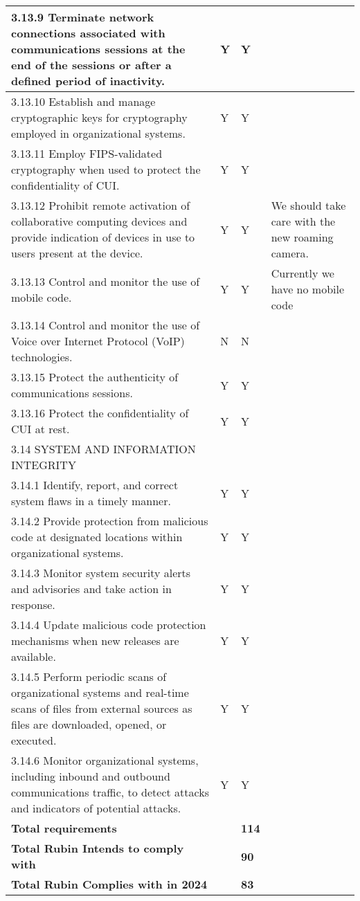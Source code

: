 \begin{longtable} {|p{}|p{}|p{}|p{} |}
{3.13.9 Terminate network connections associated with communications sessions at the end of the sessions or after a defined period of inactivity.}&{Y}&{Y}& \\ \hline
{3.13.10 Establish and manage cryptographic keys for cryptography employed in organizational systems.}&{Y}&{Y}& \\ \hline
{3.13.11 Employ FIPS-validated cryptography when used to protect the confidentiality of CUI.}&{Y}&{Y}& \\ \hline
{3.13.12 Prohibit remote activation of collaborative computing devices and provide indication of devices in use to users present at the device.}&{Y}&{Y}&{We should take care with the new roaming camera.} \\ \hline
{3.13.13 Control and monitor the use of mobile code.}&{Y}&{Y}&{Currently we have no mobile code} \\ \hline
{3.13.14 Control and monitor the use of Voice over Internet Protocol (VoIP) technologies.}&{N}&{N}& \\ \hline
{3.13.15 Protect the authenticity of communications sessions.}&{Y}&{Y}& \\ \hline
{3.13.16 Protect the confidentiality of CUI at rest.}&{Y}&{Y}& \\ \hline
{3.14 SYSTEM AND INFORMATION INTEGRITY}&&& \\ \hline
{3.14.1 Identify, report, and correct system flaws in a timely manner.}&{Y}&{Y}& \\ \hline
{3.14.2 Provide protection from malicious code at designated locations within organizational systems.}&{Y}&{Y}& \\ \hline
{3.14.3 Monitor system security alerts and advisories and take action in response.}&{Y}&{Y}& \\ \hline
{3.14.4 Update malicious code protection mechanisms when new releases are available.}&{Y}&{Y}& \\ \hline
{3.14.5 Perform periodic scans of organizational systems and real-time scans of files from external sources as files are downloaded, opened, or executed.}&{Y}&{Y}& \\ \hline
{3.14.6 Monitor organizational systems, including inbound and outbound communications traffic, to detect attacks and indicators of potential attacks.}&{Y}&{Y}& \\ \hline
\textbf{Total requirements}&\textbf{}&\textbf{114}& \\ \hline
\textbf{Total Rubin Intends to comply with }&\textbf{}&\textbf{90}& \\ \hline
\textbf{Total Rubin Complies with in 2024}&\textbf{}&\textbf{83}& \\ \hline
\end{longtable} \normalsize

